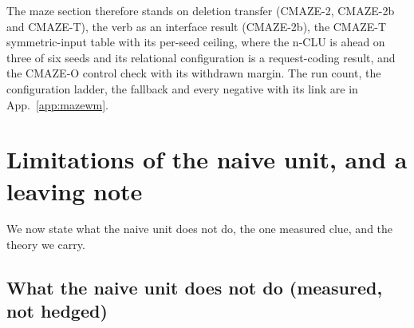 \documentclass{article} %
\begin{document}
The maze section therefore stands on deletion transfer (CMAZE-2, CMAZE-2b and CMAZE-T), the verb as
an interface result (CMAZE-2b), the CMAZE-T symmetric-input table with its per-seed ceiling, where the
n-CLU is ahead on three of six seeds and its relational configuration is a request-coding result, and
the CMAZE-O control check with its withdrawn margin. The run count, the configuration ladder, the fallback
and every negative with its link are in App.~\ref{app:mazewm}.

\section{Limitations of the naive unit, and a leaving note}
\label{sec:limits}

We now state what the naive unit does not do, the one measured clue, and the theory we carry.
\subsection{What the naive unit does not do (measured, not hedged)}
\label{sec:limits-list}
\end{document}

